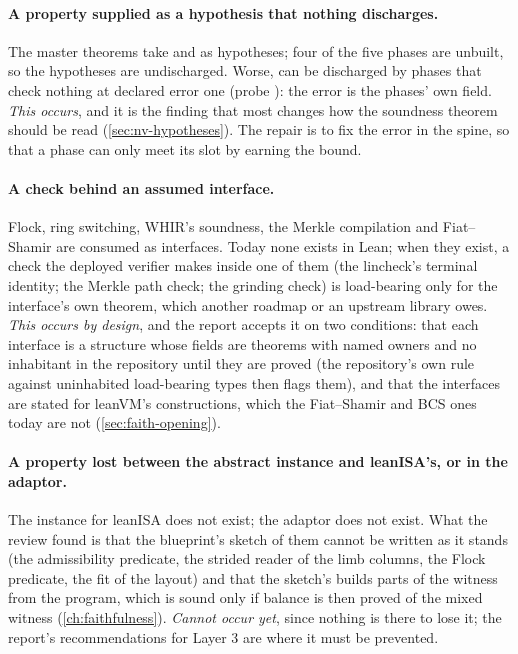 \paragraph{A property supplied as a hypothesis that nothing discharges.} The master theorems
take  and  as hypotheses; four of the five phases
are unbuilt, so the hypotheses are undischarged. Worse,  can be
discharged by phases that check nothing at declared error one (probe ): the error
is the phases' own field. \emph{This occurs}, and it is the finding that most changes how the
soundness theorem should be read (\cref{sec:nv-hypotheses}). The repair is to fix the error in
the spine, so that a phase can only meet its slot by earning the bound.

\paragraph{A check behind an assumed interface.} Flock, ring switching, WHIR's soundness, the
Merkle compilation and Fiat--Shamir are consumed as interfaces. Today none exists in Lean; when
they exist, a check the deployed verifier makes inside one of them (the lincheck's terminal
identity; the Merkle path check; the grinding check) is load-bearing only for the interface's
own theorem, which another roadmap or an upstream library owes. \emph{This occurs by design},
and the report accepts it on two conditions: that each interface is a structure whose fields are
theorems with named owners and no inhabitant in the repository until they are proved (the
repository's own rule against uninhabited load-bearing types then flags them), and that the
interfaces are stated for leanVM's constructions, which the Fiat--Shamir and BCS ones today are
not (\cref{sec:faith-opening}).

\paragraph{A property lost between the abstract instance and leanISA's, or in the adaptor.}
The instance for leanISA does not exist; the adaptor does not exist. What the review found is
that the blueprint's sketch of them cannot be written as it stands (the admissibility predicate,
the strided reader of the limb columns, the Flock predicate, the fit of the layout) and that
the sketch's  builds parts of the witness from the program, which is sound only
if balance is then proved of the mixed witness (\cref{ch:faithfulness}). \emph{Cannot occur
yet}, since nothing is there to lose it; the report's recommendations for Layer 3 are where it
must be prevented.

